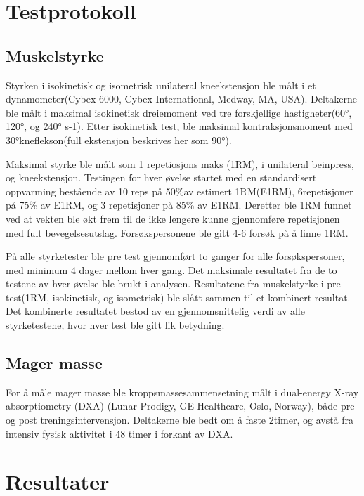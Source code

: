 \documentclass[
]{book}
\begin{document}
\hypertarget{testprotokoll}{%
\section{Testprotokoll}\label{testprotokoll}}

\hypertarget{muskelstyrke}{%
\subsection{Muskelstyrke}\label{muskelstyrke}}

Styrken i isokinetisk og isometrisk unilateral kneekstensjon ble målt i et dynamometer(Cybex 6000, Cybex International, Medway, MA, USA). Deltakerne ble målt i maksimal isokinetisk dreiemoment ved tre forskjellige hastigheter(60°, 120°, og 240° s-1). Etter isokinetisk test, ble maksimal kontraksjonsmoment med 30°kneflekson(full ekstensjon beskrives her som 90°).

Maksimal styrke ble målt som 1 repetiosjons maks (1RM), i unilateral beinpress, og kneekstensjon. Testingen for hver øvelse startet med en standardisert oppvarming bestående av 10 reps på 50\%av estimert 1RM(E1RM), 6repetisjoner på 75\% av E1RM, og 3 repetisjoner på 85\% av E1RM. Deretter ble 1RM funnet ved at vekten ble økt frem til de ikke lengere kunne gjennomføre repetisjonen med fult bevegelsesutslag. Forsøkspersonene ble gitt 4-6 forsøk på å finne 1RM.

På alle styrketester ble pre test gjennomført to ganger for alle forsøkspersoner, med minimum 4 dager mellom hver gang. Det maksimale resultatet fra de to testene av hver øvelse ble brukt i analysen. Resultatene fra muskelstyrke i pre test(1RM, isokinetisk, og isometrisk) ble slått sammen til et kombinert resultat. Det kombinerte resultatet bestod av en gjennomsnittelig verdi av alle styrketestene, hvor hver test ble gitt lik betydning.

\hypertarget{mager-masse}{%
\subsection{Mager masse}\label{mager-masse}}

For å måle mager masse ble kroppsmassesammensetning målt i dual-energy X-ray absorptiometry (DXA) (Lunar Prodigy, GE Healthcare, Oslo, Norway), både pre og post treningsintervensjon. Deltakerne ble bedt om å faste 2timer, og avstå fra intensiv fysisk aktivitet i 48 timer i forkant av DXA.

\hypertarget{resultater-3}{%
\section{Resultater}\label{resultater-3}}
\end{document}
